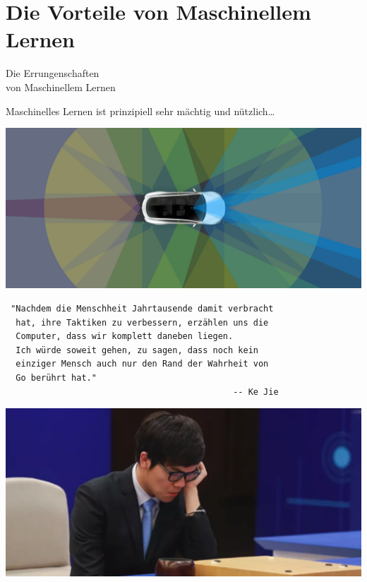 \documentclass[aspectratio=43]{beamer}
\begin{document}

\section{Die Vorteile von Maschinellem Lernen}

\begin{frame}
\begin{center}
\huge
Die Errungenschaften\\von Maschinellem Lernen
\end{center}
\end{frame}

\begin{frame}
Maschinelles Lernen ist prinzipiell sehr mächtig und nützlich\dots

\begin{center}
\includegraphics[scale=0.105]{images/autopilotnew.jpg} 
\end{center}
\end{frame}

\begin{frame}[fragile]
\small
\begin{verbatim}
 "Nachdem die Menschheit Jahrtausende damit verbracht
  hat, ihre Taktiken zu verbessern, erzählen uns die
  Computer, dass wir komplett daneben liegen.
  Ich würde soweit gehen, zu sagen, dass noch kein 
  einziger Mensch auch nur den Rand der Wahrheit von
  Go berührt hat."
                                             -- Ke Jie
\end{verbatim}

\begin{center}
\includegraphics[scale=0.65]{images/kejie.png} 
\end{center}
\end{frame}
\end{document}
